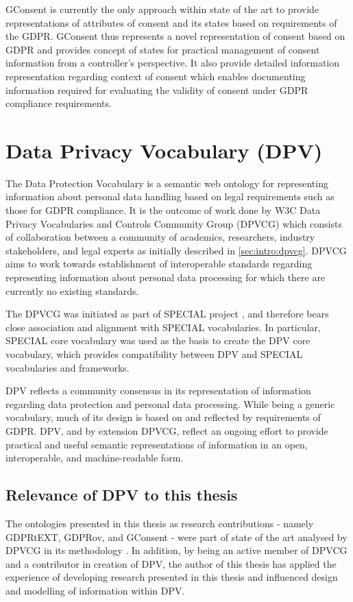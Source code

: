 GConsent is currently the only approach within state of the art to provide representations of attributes of consent and its states based on requirements of the GDPR.
GConsent thus represents a novel representation of consent based on GDPR and provides concept of states for practical management of consent information from a controller's perspective. It also provide detailed information representation regarding context of consent which enables documenting information required for evaluating the validity of consent under GDPR compliance requirements.

\section{Data Privacy Vocabulary (DPV)}\label{sec:voc:DPV}
The Data Protection Vocabulary \cite{pandit_creating_2019} is a semantic web ontology for representing information about personal data handling based on legal requirements such as those for GDPR compliance.
It is the outcome of work done by W3C Data Privacy Vocabularies and Controls Community Group (DPVCG) which consists of collaboration between a community of academics, researchers, industry stakeholders, and legal experts as initially described in \autoref{sec:intro:dpvcg}.
DPVCG aims to work towards establishment of interoperable standards regarding representing information about personal data processing for which there are currently no existing standards.

The DPVCG was initiated as part of SPECIAL project \cite{pandit_d6.5_2019}, and therefore bears close association and alignment with SPECIAL vocabularies.
In particular, SPECIAL core vocabulary was used as the basis to create the DPV core vocabulary, which provides compatibility between DPV and SPECIAL vocabularies and frameworks.

DPV reflects a community consensus in its representation of information regarding data protection and personal data processing. While being a generic vocabulary, much of its design is based on and reflected by requirements of GDPR. DPV, and by extension DPVCG, reflect an ongoing effort to provide practical and useful semantic representations of information in an open, interoperable, and machine-readable form. 

\subsection{Relevance of DPV to this thesis}
The ontologies presented in this thesis as research contributions - namely GDPRtEXT, GDPRov, and GConsent - were part of state of the art analysed by DPVCG in its methodology \cite{pandit_creating_2019}.
In addition, by being an active member of DPVCG and a contributor in creation of DPV, the author of this thesis has applied the experience of developing research presented in this thesis and influenced design and modelling of information within DPV.

